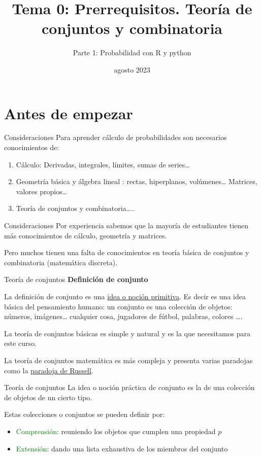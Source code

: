\documentclass[
  ignorenonframetext,
  aspectratio=169]{beamer}
\title{Tema 0: Prerrequisitos. Teoría de conjuntos y combinatoria}
\author{Parte 1: Probabilidad con R y python}
\date{agosto 2023}
\providecommand{\tightlist}{%
  \setlength{\itemsep}{0pt}\setlength{\parskip}{0pt}}\usepackage{longtable,booktabs,array}
\newcommand\green[1]{\textcolor{green}{#1}}
\begin{document}
\frame{\titlepage}
\hypertarget{antes-de-empezar}{%
\section{Antes de empezar}\label{antes-de-empezar}}

\begin{frame}{Consideraciones}
\protect\hypertarget{consideraciones}{}
Para aprender cálculo de probabilidades son necesarios conocimientos de:

\begin{enumerate}
\tightlist
\item
  Cálculo: Derivadas, integrales, límites, sumas de series\ldots{}
\item
  Geometría básica y álgebra lineal : rectas, hiperplanos,
  volúmenes\ldots{} Matrices, valores propios\ldots{}
\item
  Teoría de conjuntos y combinatoria\ldots..
\end{enumerate}
\end{frame}

\begin{frame}{Consideraciones}
\protect\hypertarget{consideraciones-1}{}
Por experiencia sabemos que la mayoría de estudiantes tienen más
conocimientos de cálculo, geometría y matrices.

Pero muchos tienen una falta de conocimientos en teoría básica de
conjuntos y combinatoria (matemática discreta).
\end{frame}

\begin{frame}{Teoría de conjuntos}
\protect\hypertarget{teoruxeda-de-conjuntos}{}
\textbf{Definición de conjunto}

La definición de conjunto es una
\href{https://es.wikipedia.org/wiki/Concepto_primitivo}{idea o noción
primitiva}. Es decir es una idea básica del pensamiento humano: un
conjunto es una colección de objetos: números, imágenes\ldots{}
cualquier cosa, jugadores de fútbol, palabras, colores \ldots.

La teoría de conjuntos básicas es simple y natural y es la que
necesitamos para este curso.

La teoría de conjuntos matemática es más compleja y presenta varias
paradojas como la
\href{https://es.wikipedia.org/wiki/Paradoja_de_Russell}{paradoja de
Russell}.
\end{frame}

\begin{frame}{Teoría de conjuntos}
\protect\hypertarget{teoruxeda-de-conjuntos-1}{}
La idea o noción práctica de conjunto es la de una colección de objetos
de un cierto tipo.

Estas colecciones o conjuntos se pueden definir por:

\begin{itemize}
\tightlist
\item
  \green{Comprensión}: reuniendo los objetos que cumplen una propiedad
  \(p\)
\item
  \green{Extensión}: dando una lista exhaustiva de los miembros del
  conjunto
\end{itemize}
\end{frame}
\end{document}
